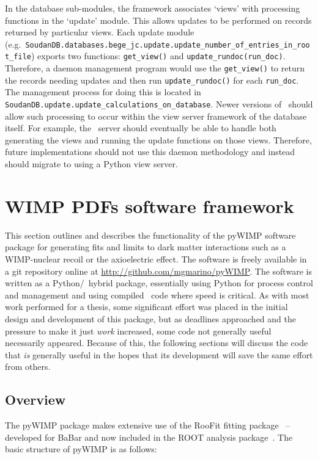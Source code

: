 			\lstset{language=Python}		
	In the database sub-modules, the framework associates `views' with
processing functions in the `update' module.  This allows updates to be
performed on records returned by particular views.  Each update module
(e.g.~\lstinline!SoudanDB.databases.bege_jc.update.update_number_of_entries_in_root_file!)
exports two functions: \lstinline!get_view()! and \lstinline!update_rundoc(run_doc)!.  Therefore,
a daemon management program would use the \lstinline!get_view()! to return the records needing
updates and then run \lstinline!update_rundoc()! for each \lstinline!run_doc!.  The management process
for doing this is located in \lstinline!SoudanDB.update.update_calculations_on_database!.
Newer versions of \couchdb~should allow such processing to occur within the
view server framework of the database itself.  For example, the \couchdb~server should eventually be
able to handle both generating the views and running the update functions on
those views.  Therefore, future implementations should not use this daemon
methodology and instead should migrate to using a Python view server.  

		
	\section{WIMP PDFs software framework}
	\label{sec:WIMPPDFs}
	This section outlines and describes the functionality of the pyWIMP software package for generating fits and limits
to dark matter interactions such as a WIMP-nuclear recoil or the axioelectric effect.  The software is freely available in a 
git repository online at \url{http://github.com/mgmarino/pyWIMP}.  The software is written as a Python/\cpp~hybrid package, essentially
using Python for process control and management and using compiled \cpp~code where speed is critical.  As with most work performed for a thesis, some significant effort was placed in the initial design and development of this package, but as deadlines approached and the pressure to make it just \emph{work} increased, some code not generally useful necessarily appeared.  Because of this, the following sections will discuss the code that \emph{is} generally useful in the hopes that its development will save the same effort from others.  
	
		\subsection{Overview}
	The pyWIMP package makes extensive use of the RooFit fitting package~\cite{ver03aa} -- developed for BaBar and now included in the ROOT analysis package~\cite{Bru97}.  The basic structure of pyWIMP is as follows:
	
